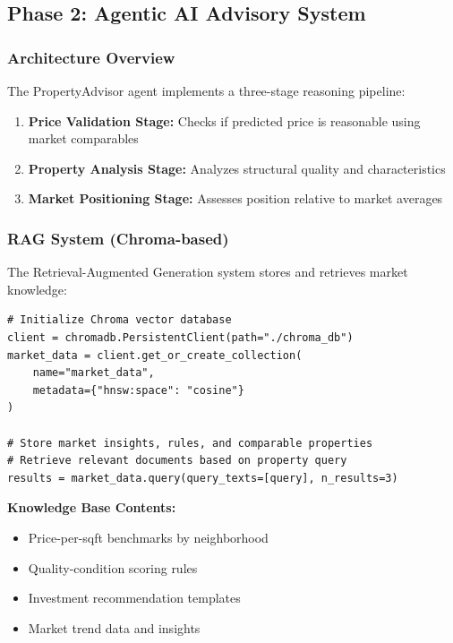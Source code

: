 \documentclass[11pt,a4paper]{article}
\begin{document}
\subsection{Phase 2: Agentic AI Advisory System}

\subsubsection{Architecture Overview}

The PropertyAdvisor agent implements a three-stage reasoning pipeline:

\begin{enumerate}
    \item \textbf{Price Validation Stage:} Checks if predicted price is reasonable using market comparables
    \item \textbf{Property Analysis Stage:} Analyzes structural quality and characteristics
    \item \textbf{Market Positioning Stage:} Assesses position relative to market averages
\end{enumerate}

\subsubsection{RAG System (Chroma-based)}

The Retrieval-Augmented Generation system stores and retrieves market knowledge:

\begin{lstlisting}
# Initialize Chroma vector database
client = chromadb.PersistentClient(path="./chroma_db")
market_data = client.get_or_create_collection(
    name="market_data",
    metadata={"hnsw:space": "cosine"}
)

# Store market insights, rules, and comparable properties
# Retrieve relevant documents based on property query
results = market_data.query(query_texts=[query], n_results=3)
\end{lstlisting}

\textbf{Knowledge Base Contents:}
\begin{itemize}
    \item Price-per-sqft benchmarks by neighborhood
    \item Quality-condition scoring rules
    \item Investment recommendation templates
    \item Market trend data and insights
\end{itemize}
\end{document}
